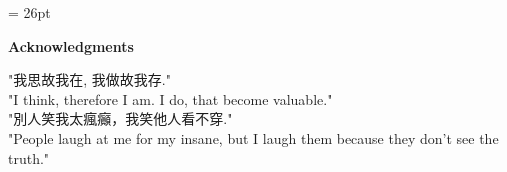 

\baselineskip = 26pt


\newpage
{}



\begin{center}
\large \textbf{Acknowledgments}
\end{center}


"我思故我在, 我做故我存."\\
"I think, therefore I am. I do, that become valuable."\\

"別人笑我太瘋癲，我笑他人看不穿."\\
"People laugh at me for my insane, but I laugh them because they don't see the truth."\\



